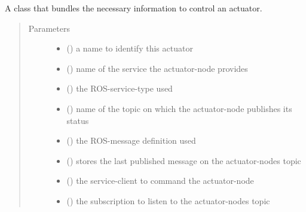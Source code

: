\documentclass[a4paper,12pt,english]{article}
\begin{document}
\begin{fulllineitems}
\label{\detokenize{osbk_operation:osbk_operation.actuator_state_machine.ActuatorEntry}}
A class that bundles the necessary information to control an actuator.
\begin{quote}\begin{description}
\item[{Parameters}] \leavevmode\begin{itemize}
\item {} 
 () \textendash{} a name to identify this actuator

\item {} 
 () \textendash{} name of the service the actuator-node provides

\item {} 
 () \textendash{} the ROS-service-type used

\item {} 
 () \textendash{} name of the topic on which the actuator-node publishes its status

\item {} 
 () \textendash{} the ROS-message definition used

\item {} 
 () \textendash{} stores the last published message on the actuator-nodes topic

\item {} 
 () \textendash{} the service-client to command the actuator-node

\item {} 
 () \textendash{} the subscription to listen to the actuator-nodes topic

\end{itemize}

\end{description}\end{quote}

\end{fulllineitems}
\end{document}
